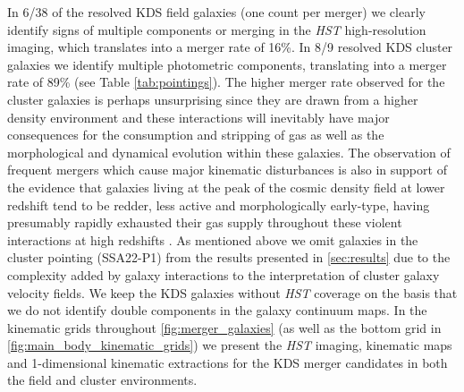 \documentclass[fleqn,usenatbib]{mn2e}
\begin{document}
In 6/38 of the resolved KDS field galaxies (one count per merger) we clearly identify signs of multiple components or merging in the {\em HST} high-resolution imaging, which translates into a merger rate of 16\%.
In 8/9 resolved KDS cluster galaxies we identify multiple photometric components, translating into a merger rate of 89\%  (see Table \ref{tab:pointings}).
The higher merger rate observed for the cluster galaxies is perhaps unsurprising since they are drawn from a higher density environment and these interactions will inevitably have major consequences for the consumption and stripping of gas as well as the morphological and dynamical evolution within these galaxies.
The observation of frequent mergers which cause major kinematic disturbances is also in support of the evidence that galaxies living at the peak of the cosmic density field at lower redshift tend to be redder, less active and morphologically early-type, having presumably rapidly exhausted their gas supply throughout these violent interactions at high redshifts \citep[e.g.][]{Steidel1998,White2007,Kodama2007,Zheng2009}.
As mentioned above we omit galaxies in the cluster pointing (SSA22-P1) from the results presented in \cref{sec:results} due to the complexity added by galaxy interactions to the interpretation of cluster galaxy velocity fields.
We keep the KDS galaxies without {\em HST} coverage on the basis that we do not identify double components in the galaxy continuum maps. 
In the kinematic grids throughout \ref{fig:merger_galaxies} (as well as the bottom grid in \ref{fig:main_body_kinematic_grids}) we present the {\em HST} imaging, kinematic maps and 1-dimensional kinematic extractions for the KDS merger candidates in both the field and cluster environments.
\end{document}
